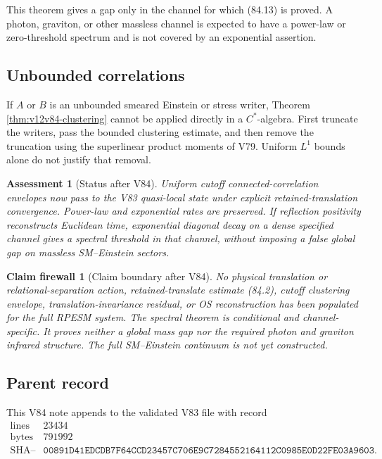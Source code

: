 \documentclass[11pt]{article}
\newtheorem{firewall}[theorem]{Claim firewall}
\newtheorem{assessment}[theorem]{Assessment}
\theoremstyle{remark}
\begin{document}
This theorem gives a gap only in the channel for which (84.13) is
proved.  A photon, graviton, or other massless channel is expected to
have a power-law or zero-threshold spectrum and is not covered by an
exponential assertion.

\subsection{Unbounded correlations}

If \(A\) or \(B\) is an unbounded smeared Einstein or stress writer,
Theorem \ref{thm:v12v84-clustering} cannot be applied directly in a
\(C^*\)-algebra.  First truncate the writers, pass the bounded
clustering estimate, and then remove the truncation using the
superlinear product moments of V79.  Uniform \(L^1\) bounds alone do
not justify that removal.

\begin{assessment}[Status after V84]
\label{ass:v12v84-status}
Uniform cutoff connected-correlation envelopes now pass to the V83
quasi-local state under explicit retained-translation convergence.
Power-law and exponential rates are preserved.  If reflection
positivity reconstructs Euclidean time, exponential diagonal decay
on a dense specified channel gives a spectral threshold in that
channel, without imposing a false global gap on massless SM--Einstein
sectors.
\end{assessment}

\begin{firewall}[Claim boundary after V84]
\label{fire:v12v84-claim}
No physical translation or relational-separation action,
retained-translate estimate (84.2), cutoff clustering envelope,
translation-invariance residual, or OS reconstruction has been
populated for the full RPESM system.  The spectral theorem is
conditional and channel-specific.  It proves neither a global mass
gap nor the required photon and graviton infrared structure.
The full SM--Einstein continuum is not yet constructed.
\end{firewall}

\subsection{Parent record}

This V84 note appends to the validated V83 file with record
\[
\begin{array}{c|c}
\text{lines}&23434\\
\text{bytes}&791992\\
\text{SHA--256}&
\texttt{00891D41EDCDB7F64CCD23457C706E9C7284552164112C0985E0D22FE03A9603}.
\end{array}
\]
\end{document}
